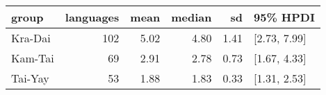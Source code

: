 
\begin{tabular}[t]{lrrrrl}
\toprule
group & languages & mean & median & sd & 95\% HPDI\\
\midrule
Kra-Dai & 102 & 5.02 & 4.80 & 1.41 & {}[2.73, 7.99]\\
Kam-Tai & 69 & 2.91 & 2.78 & 0.73 & {}[1.67, 4.33]\\
Tai-Yay & 53 & 1.88 & 1.83 & 0.33 & {}[1.31, 2.53]\\
\bottomrule
\end{tabular}
